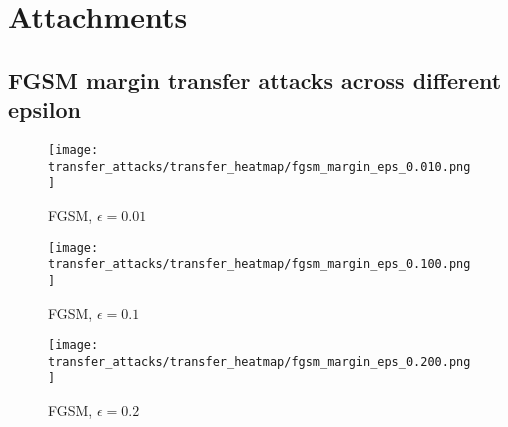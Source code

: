
\appendix
\chapter{Attachments}

\section{FGSM margin transfer attacks across different epsilon}

\begin{figure}[h]
    \texttt{[image: transfer\_attacks/transfer\_heatmap/fgsm\_margin\_eps\_0.010.png]}
    \caption{FGSM, $\epsilon = 0.01$}

    \texttt{[image: transfer\_attacks/transfer\_heatmap/fgsm\_margin\_eps\_0.100.png]}
    \caption{FGSM, $\epsilon = 0.1$}

    \texttt{[image: transfer\_attacks/transfer\_heatmap/fgsm\_margin\_eps\_0.200.png]}
    \caption{FGSM, $\epsilon = 0.2$}
\end{figure}


